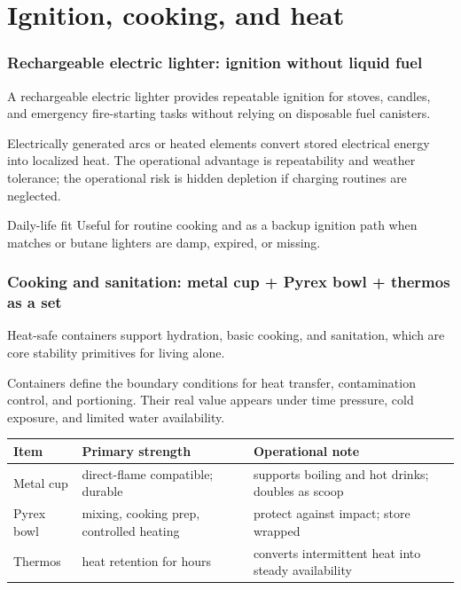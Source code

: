 

\section{Ignition, cooking, and heat}

\begin{frame}[t]
  \frametitle{Rechargeable electric lighter: ignition without liquid fuel}
  \justifying
   A rechargeable electric lighter provides repeatable ignition for stoves, candles, and emergency fire-starting tasks without relying on disposable fuel canisters.

  \vspace{0.5em}
   Electrically generated arcs or heated elements convert stored electrical energy into localized heat. The operational advantage is repeatability and weather tolerance; the operational risk is hidden depletion if charging routines are neglected.

  \vspace{0.8em}
  \begin{block}{Daily-life fit}
    Useful for routine cooking and as a backup ignition path when matches or butane lighters are damp, expired, or missing.
  \end{block}
\end{frame}

\begin{frame}[t,shrink=2]
  \frametitle{Cooking and sanitation: metal cup + Pyrex bowl + thermos as a set}
  \justifying
   Heat-safe containers support hydration, basic cooking, and sanitation, which are core stability primitives for living alone.

  \vspace{0.5em}
   Containers define the boundary conditions for heat transfer, contamination control, and portioning. Their real value appears under time pressure, cold exposure, and limited water availability.

  \vspace{0.8em}
  \TableBodySize
  \begin{table}
    \centering
    \begin{tabularx}{\textwidth}{@{}lX X@{}}
      \toprule
      \textbf{Item} & \textbf{Primary strength} & \textbf{Operational note} \\
      \midrule
      Metal cup & direct-flame compatible; durable & supports boiling and hot drinks; doubles as scoop \\
      Pyrex bowl & mixing, cooking prep, controlled heating & protect against impact; store wrapped \\
      Thermos & heat retention for hours & converts intermittent heat into steady availability \\
      \bottomrule
    \end{tabularx}
  \end{table}
\end{frame}

